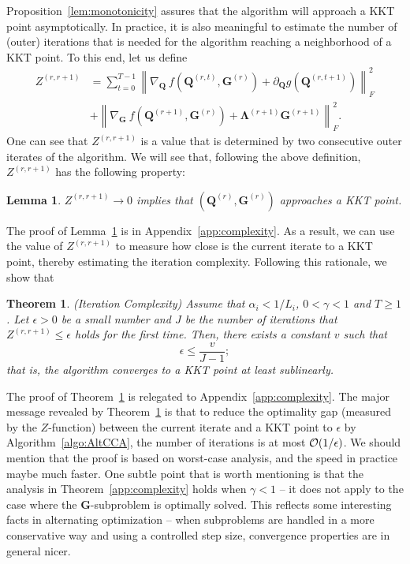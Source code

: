 \documentclass[10pt,journal]{IEEEtran}
\newtheorem{Lemma}{Lemma}
\newtheorem{Theorem}{Theorem}
\newcommand{\G}{\boldsymbol{G}}
\newcommand{\Q}{\boldsymbol{Q}}
\begin{document}
Proposition~\ref{lem:monotonicity} assures that the algorithm will approach a KKT point asymptotically.
In practice, it is also meaningful to estimate the number of (outer) iterations that is needed for the algorithm reaching a neighborhood of a KKT point.
To this end, let us define
\begin{equation}
\begin{aligned}
Z^{(r,r+1)} &=\sum_{t=0}^{T-1}\left\|\nabla_{\Q}~f\left(\Q^{(r,t)},\G^{(r)}\right) + \partial_{\Q} g\left(\Q^{(r,t+1)}\right)\right\|_F^2\\
                                                   &+ \left\| \nabla_{\G}~f\left(\Q^{(r+1)},\G^{(r)}\right) + {\bm \Lambda}^{(r+1)}\G^{(r+1)} \right\|_F^2.
\end{aligned}
\end{equation}
One can see that $Z^{(r,r+1)}$ is a value that is determined by two consecutive outer iterates of the algorithm.
We will see that, following the above definition, $Z^{(r,r+1)}$ has the following property:
\begin{Lemma}\label{lem:z}
$Z^{(r,r+1)}\rightarrow 0$ implies that $(\Q^{(r)},\G^{(r)})$ approaches a KKT point.
\end{Lemma}
The proof of Lemma~\ref{lem:z} is in Appendix~\ref{app:complexity}.
As a result, we can use the value of $Z^{(r,r+1)}$
to measure how close is the current iterate to a KKT point, thereby estimating the iteration complexity.
Following this rationale, we show that

\begin{Theorem}\label{thm:complexity}
(Iteration Complexity) Assume that $\alpha_i<1/L_i$, $0<\gamma<1$ and $T\geq 1$.
Let $\epsilon> 0$ be a small number and $J$ be the number of iterations that $Z^{(r,r+1)}\leq \epsilon$ holds for the first time.
Then, there exists a constant $v$ such that
\[\epsilon \leq \frac{v}{J-1};\]
that is, the algorithm converges to a KKT point at least sublinearly.
\end{Theorem}
The proof of Theorem~\ref{thm:complexity} is relegated to Appendix~\ref{app:complexity}.
The major message revealed by Theorem~\ref{thm:complexity} is that to reduce the optimality gap (measured by the $Z$-function) between the current iterate and a KKT point to $\epsilon$ by Algorithm~\ref{algo:AltCCA}, the number of iterations is at most ${\cal O}(1/\epsilon)$. We should mention that the proof is based on worst-case analysis, and the speed in practice maybe much faster.
One subtle point that is worth mentioning is that the analysis in Theorem~\ref{app:complexity} holds when $\gamma<1$ -- it does not apply to the case where the ${\bm G}$-subproblem is optimally solved. This reflects some interesting facts in alternating optimization -- when subproblems are handled in a more conservative way and using a controlled step size, convergence properties are in general nicer. 
\end{document}
